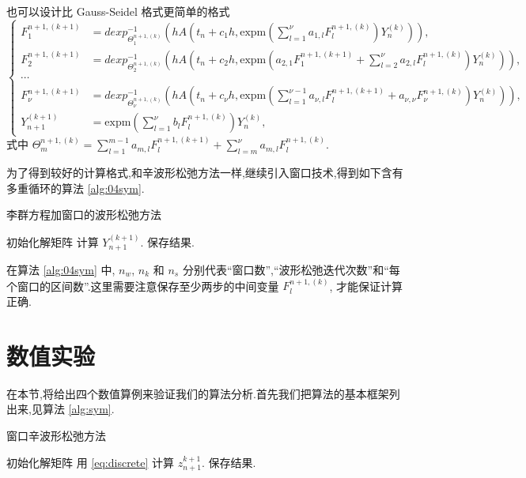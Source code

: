 也可以设计比 Gauss-Seidel 格式更简单的格式
\begin{equation*}
	\left\lbrace\begin{aligned}
		F_1^{n+1,(k+1)}&=dexp_{\Theta_1^{n+1,(k)}}^{-1}(hA(t_n+c_1h,\mbox{expm}(\sum_{l=1}^{\nu}a_{1,l}F_l^{n+1,(k)})Y_n^{(k)})),\\
		F_2^{n+1,(k+1)}&=dexp_{\Theta_2^{n+1,(k)}}^{-1}(hA(t_n+c_2h,\mbox{expm}(a_{2,1}F_1^{n+1,(k+1)}+\sum_{l=2}^{\nu}a_{2,l}F_l^{n+1,(k)})Y_n^{(k)})),\\
		\cdots \\
		F_{\nu}^{n+1,(k+1)}&=dexp_{\Theta_{\nu}^{n+1,(k)}}^{-1}(hA(t_n+c_{\nu}h,\mbox{expm}(\sum_{l=1}^{\nu-1}a_{\nu,l}F_{l}^{n+1,(k+1)}+a_{\nu,\nu}F_{\nu}^{n+1,(k)})Y_n^{(k)})),\\
		Y_{n+1}^{(k+1)}&=\mbox{expm}(\sum_{l=1}^{\nu}b_lF_l^{n+1,(k)})Y_n^{(k)},
	\end{aligned}\right.
\end{equation*}
式中 $\Theta_m^{n+1,(k)} = \sum_{l=1}^{m-1}a_{m,l}F_{l}^{n+1,(k+1)}+\sum_{l=m}^{\nu}a_{m,l}F_l^{n+1,(k)}$.

为了得到较好的计算格式,和辛波形松弛方法一样,继续引入窗口技术,得到如下含有多重循环的算法 \ref{alg:04sym}.

\begin{algorithm}
\caption{李群方程加窗口的波形松弛方法}
\label{alg:04sym}
\begin{algorithmic}
\STATE 初始化解矩阵
             \STATE 计算 $Y_{n+1}^{(k+1)}$.
        \ENDFOR
    \ENDFOR
\ENDFOR
\STATE 保存结果.
\end{algorithmic}
\end{algorithm}
在算法 \ref{alg:04sym} 中, $n_w$, $n_k$ 和 $n_s$ 分别代表``窗口数'',``波形松弛迭代次数''和``每个窗口的区间数''.这里需要注意保存至少两步的中间变量 $F_l^{n+1,(k)}$, 才能保证计算正确.

\section{数值实验}\label{sec:03numerical}
在本节,将给出四个数值算例来验证我们的算法分析.首先我们把算法的基本框架列出来,见算法 \ref{alg:sym}.

\begin{algorithm}
\caption{窗口辛波形松弛方法}
\label{alg:sym}
\begin{algorithmic}
\STATE 初始化解矩阵
             \STATE 用 \eqref{eq:discrete} 计算 $z_{n+1}^{k+1}$.
        \ENDFOR
    \ENDFOR
\ENDFOR
\STATE 保存结果.
\end{algorithmic}
\end{algorithm}

